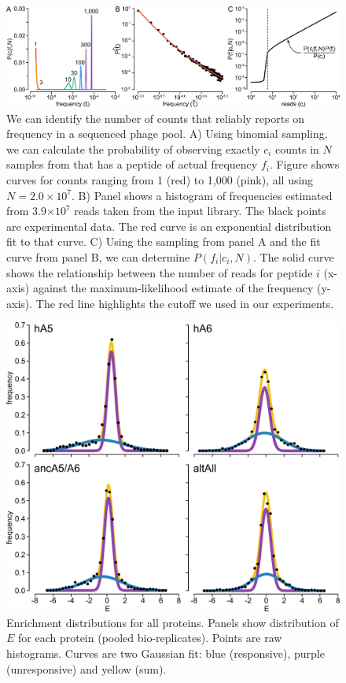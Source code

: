 \begin{figure}%
\centering
	\includegraphics{ch6-figS2.png} 
\caption[We can identify the number of counts that reliably
reports on frequency in a sequenced phage pool]{We can identify the number of counts that reliably
reports on frequency in a sequenced phage pool. A) Using binomial
sampling, we can calculate the probability of observing exactly $c_{i}$
counts in $N$ samples from that has a peptide of actual frequency
$f_{i}$. Figure shows curves for counts ranging from 1 (red) to 1,000
(pink), all using $N=2.0\times10^{7}$. B) Panel shows a histogram
of frequencies estimated from 3.9$\times$$10^{7}$ reads taken from
the input library. The black points are experimental data. The red
curve is an exponential distribution fit to that curve. C) Using the
sampling from panel A and the fit curve from panel B, we can determine
$P(f_{i}|c_{i},N)$. The solid curve shows the relationship between
the number of reads for peptide $i$ (x-axis) against the maximum-likelihood
estimate of the frequency (y-axis). The red line highlights the cutoff
we used in our experiments.\label{samplefigure}}	
\end{figure}

\begin{figure}%
\centering
	\includegraphics{ch6-figS3.png} 
\caption[Enrichment distributions for all proteins]{Enrichment distributions for all proteins. Panels show distribution of $E$ for
each protein (pooled bio-replicates). Points are raw histograms. Curves
are two Gaussian fit: blue (responsive), purple (unresponsive) and
yellow (sum).\label{samplefigure}}	
\end{figure}

